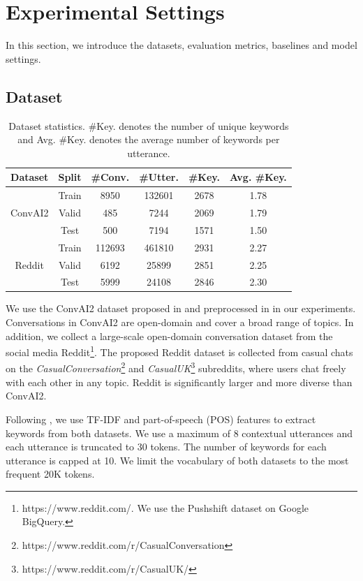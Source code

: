 \documentclass[letterpaper]{article} %
\begin{document}
\section{Experimental Settings}
\label{sec: experiments}
In this section, we introduce the datasets, evaluation metrics, baselines and model settings.
\subsection{Dataset}
\label{sec: dataset}
\begin{table}[!t]
\small
\centering
\begin{tabular}{cccccc}
\hline
\textbf{Dataset} & \textbf{Split} & \textbf{\#Conv.} & \textbf{\#Utter.} & \textbf{\#Key.} & \textbf{Avg. \#Key.}\\
\hline
\multirow{3}{*}{ConvAI2} & Train & 8950 & 132601 & 2678 & 1.78\\
& Valid & 485 & 7244 & 2069 & 1.79\\
& Test & 500 & 7194 & 1571 & 1.50\\
\hline
\multirow{3}{*}{Reddit} & Train & 112693 & 461810 & 2931 & 2.27\\
& Valid & 6192 & 25899 & 2851 & 2.25\\
& Test & 5999 & 24108 & 2846 & 2.30\\
\hline
\end{tabular}
\caption{Dataset statistics. \#Key. denotes the number of unique keywords and Avg. \#Key. denotes the average number of keywords per utterance.}
\label{table: dataset}
\end{table}
We use the ConvAI2 dataset proposed in \cite{zhang2018personalizing,dinan2019second} and preprocessed in \cite{tang2019target} in our experiments. Conversations in ConvAI2 are open-domain and cover a broad range of topics. In addition, we collect a large-scale open-domain conversation dataset from the social media Reddit\footnote{https://www.reddit.com/. We use the Pushshift dataset on Google BigQuery.}. The proposed Reddit dataset is collected from casual chats on the \textit{CasualConversation}\footnote{https://www.reddit.com/r/CasualConversation} and \textit{CasualUK}\footnote{https://www.reddit.com/r/CasualUK/} subreddits, where users chat freely with each other in any topic. Reddit is significantly larger and more diverse than ConvAI2.

Following \cite{tang2019target}, we use TF-IDF and part-of-speech (POS) features to extract keywords from both datasets. We use a maximum of 8 contextual utterances and each utterance is truncated to 30 tokens. The number of keywords for each utterance is capped at 10. We limit the vocabulary of both datasets to the most frequent 20K tokens.
\end{document}
